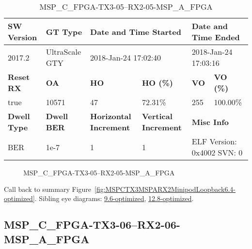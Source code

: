 \begin{table}[h]
\centering
\caption{MSP\_C\_FPGA-TX3-05--RX2-05-MSP\_A\_FPGA}
\label{tab:MSPCFPGATX305RX205MSPAFPGA6.4-optimized}
\begin{tabular}{@{}|l|l|l|l|l|l|@{}}
\toprule
\textbf{SW Version}                & \textbf{GT Type}   & \multicolumn{2}{l|}{\textbf{Date and Time Started}}            & \multicolumn{2}{l|}{\textbf{Date and Time Ended}}        \\ \midrule
2017.2                       & UltraScale GTY          & \multicolumn{2}{l|}{2018-Jan-24 17:02:40}                   & \multicolumn{2}{l|}{2018-Jan-24 17:03:16}               \\ \midrule
\textbf{Reset RX}                  & \textbf{OA} & \textbf{HO}   & \textbf{HO (\%)} & \textbf{VO} & \textbf{VO (\%)} \\ \midrule
true & 10571        & 47          & 72.31\%        & 255        & 100.00\%       \\ \midrule
\textbf{Dwell Type}                & \textbf{Dwell BER} & \textbf{Horizontal Increment} & \textbf{Vertical Increment}    & \multicolumn{2}{l|}{\textbf{Misc Info}}                  \\ \midrule
BER                            & 1e-7        & 1        & 1           & \multicolumn{2}{l|}{ELF Version: 0x4002 SVN: 0}                         \\ \bottomrule
\end{tabular}
\end{table}

\begin{figure}[h]
\caption{MSP\_C\_FPGA-TX3-05--RX2-05-MSP\_A\_FPGA} \label{fig:MSPCFPGATX305RX205MSPAFPGA6.4-optimized}
\end{figure}

Call back to summary Figure~\ref{fig:MSPCTX3MSPARX2MinipodLoopback6.4-optimized}.
Sibling eye diagrams: \hyperref[sec:MSPCFPGATX305RX205MSPAFPGA9.6-optimized]{9.6-optimized}, \hyperref[sec:MSPCFPGATX305RX205MSPAFPGA12.8-optimized]{12.8-optimized}.

\clearpage
\newpage


\subsection{MSP\_C\_FPGA-TX3-06--RX2-06-MSP\_A\_FPGA}\label{sec:MSPCFPGATX306RX206MSPAFPGA6.4-optimized}

